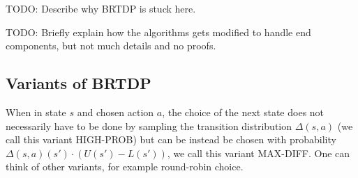 \begin{example}
    TODO: Describe why BRTDP is stuck here.

\hfill \break
\centering
{}
\end{example}

TODO: Briefly explain how the algorithms gets modified to handle end
components, but not much details and no proofs.

\subsection*{Variants of BRTDP}
When in state $s$ and chosen action $a$,
the choice of the next state does not necessarily have to be done by
sampling the transition distribution $\Delta(s,a)$ (we call this variant
HIGH-PROB) but can be instead be chosen with probability
$\Delta(s,a)(s') \cdot (U(s') - L(s'))$, we call this variant MAX-DIFF.
One can think of other variants, for example round-robin choice.

